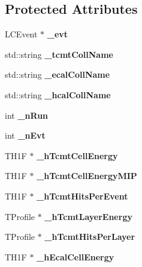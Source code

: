 \subsection*{Protected Attributes}
\begin{DoxyCompactItemize}
\item 
L\-C\-Event $\ast$ {\bfseries \-\_\-evt}\label{classdigisim_1_1Analysis_a2080e48dd7f1a2a4275486263bdaadf6}

\item 
std\-::string {\bfseries \-\_\-tcmt\-Coll\-Name}\label{classdigisim_1_1Analysis_a9613be73c5f30f19f8fa966abe0ad956}

\item 
std\-::string {\bfseries \-\_\-ecal\-Coll\-Name}\label{classdigisim_1_1Analysis_a9dcf5a8273a4c70db4293d5a85625ac3}

\item 
std\-::string {\bfseries \-\_\-hcal\-Coll\-Name}\label{classdigisim_1_1Analysis_aa9e8df324923e3b95a3b666062e712ea}

\item 
int {\bfseries \-\_\-n\-Run}\label{classdigisim_1_1Analysis_a22f4ac6af41dd1ee09f5eadb99c7667a}

\item 
int {\bfseries \-\_\-n\-Evt}\label{classdigisim_1_1Analysis_ad96aa588bfffd028fd3d0570dbf15b14}

\item 
T\-H1\-F $\ast$ {\bfseries \-\_\-h\-Tcmt\-Cell\-Energy}\label{classdigisim_1_1Analysis_adfa670531c288ca2aa896ebc2a696085}

\item 
T\-H1\-F $\ast$ {\bfseries \-\_\-h\-Tcmt\-Cell\-Energy\-M\-I\-P}\label{classdigisim_1_1Analysis_a6f24be97f2b61afd138cc80964acaa10}

\item 
T\-H1\-F $\ast$ {\bfseries \-\_\-h\-Tcmt\-Hits\-Per\-Event}\label{classdigisim_1_1Analysis_af40c47d62f171a8ef64c89ea27adb477}

\item 
T\-Profile $\ast$ {\bfseries \-\_\-h\-Tcmt\-Layer\-Energy}\label{classdigisim_1_1Analysis_aa38b5f4f0176e2f1c587f8d17f20c560}

\item 
T\-Profile $\ast$ {\bfseries \-\_\-h\-Tcmt\-Hits\-Per\-Layer}\label{classdigisim_1_1Analysis_a02a3142dee8ed1f0366d569649b5e9d3}

\item 
T\-H1\-F $\ast$ {\bfseries \-\_\-h\-Ecal\-Cell\-Energy}\label{classdigisim_1_1Analysis_af4dc9cf9e10e1a754f44c2b9171499e2}


\end{DoxyCompactItemize}
